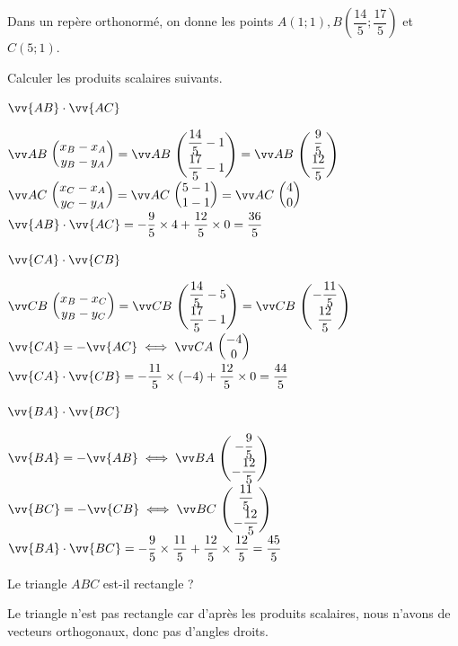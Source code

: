 \documentclass[11pt,a4paper]{article}  %
\begin{document}
\exercice{}
Dans un repère orthonormé, on donne les points $A(1 ; 1), B\left(\dfrac{14}{5} ; \dfrac{17}{5}\right)$ et $C(5 ; 1)$.
\begin{enumMet}
	\item Calculer les produits scalaires suivants.
	\begin{enumMet}
		\item $\vv{A B} \cdot \vv{A C}$
		\begin{corrBox}
			$\Coord{AB}{x_B-x_A}{y_B-y_A}=\Coord{AB}{\dfrac{14}{5}-1}{\dfrac{17}{5}-1}=\Coord{AB}{\dfrac{9}{5}}{\dfrac{12}{5}}$\quad$\Coord{AC}{x_C-x_A}{y_C-y_A}=\Coord{AC}{5-1}{1-1}=\Coord{AC}{4}{0}$
			$\vv{A B} \cdot \vv{A C}=-\dfrac{9}{5}\times 4+\dfrac{12}{5}\times 0=\dfrac{36}{5}$
		\end{corrBox}
		\item $\vv{C A} \cdot \vv{C B}$
		\begin{corrBox}
			$\Coord{CB}{x_B-x_C}{y_B-y_C}=\Coord{CB}{\dfrac{14}{5}-5}{\dfrac{17}{5}-1}=\Coord{CB}{-\dfrac{11}{5}}{\dfrac{12}{5}}$\quad\quad $\vv{CA}=-\vv{AC} \iff \Coord{CA}{-4}{0}$\\
			$\vv{CA} \cdot \vv{CB}=-\dfrac{11}{5}\times (-4)+\dfrac{12}{5}\times 0=\dfrac{44}{5}$
			\end{corrBox}
		\item $\vv{B A} \cdot \vv{B C}$
		\begin{corrBox}
			$\vv{BA}=-\vv{AB} \iff \Coord{BA}{-\dfrac{9}{5}}{-\dfrac{12}{5}}$\quad\quad $\vv{BC}=-\vv{CB} \iff \Coord{BC}{\dfrac{11}{5}}{-\dfrac{12}{5}}$\\
			$\vv{BA} \cdot \vv{BC}=-\dfrac{9}{5}\times \dfrac{11}{5}+\dfrac{12}{5}\times \dfrac{12}{5}=\dfrac{45}{5}$
		\end{corrBox}
	\end{enumMet}
	\item Le triangle $A B C$ est-il rectangle ?
	\begin{corrBox}
		Le triangle n'est pas rectangle car d'après les produits scalaires, nous n'avons de vecteurs orthogonaux, donc pas d'angles droits.
	\end{corrBox}
\end{enumMet}
\end{document}

